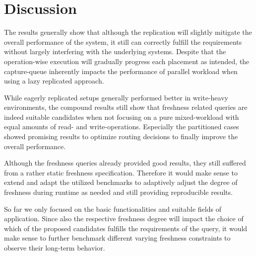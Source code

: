 




\section{Discussion}
\label{sec:discussion}

The results generally show that although the replication will slightly mitigate the overall performance of the system, it still can correctly fulfill the 
requirements without largely interfering with the underlying systems. 
Despite that the operation-wise execution will gradually progress each placement as intended, the capture-queue inherently impacts the performance of parallel workload
when using a lazy replicated approach.

While eagerly replicated setups generally performed better in write-heavy environments, 
the compound results still show that freshness related queries are indeed suitable candidates when not focusing on a pure mixed-workload with equal amounts of 
read- and write-operations. 
Especially the partitioned cases showed promising results to optimize routing decisions to finally improve the overall performance.


Although the freshness queries already provided good results, they still suffered from a rather static freshness specification. 
Therefore it would make sense to extend and adapt the utilized benchmarks to adaptively adjust the degree of freshness during runtime
as needed and still providing reproducible results.

So far we only focused on the basic functionalities and suitable fields of application.
Since also the respective freshness degree will impact the choice of which of the proposed candidates fulfills the requirements of the query,
it would make sense to further benchmark different varying freshness constraints to observe their long-term behavior. 






